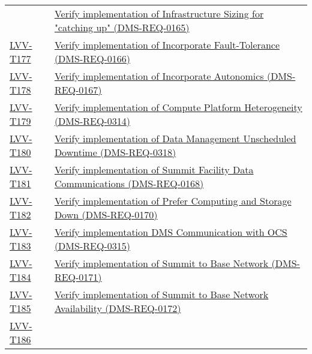 \begin{longtable}[]{@{}ll@{}}
&
\href{https://jira.lsstcorp.org/secure/Tests.jspa\#/testCase/LVV-T176}{Verify
implementation of Infrastructure Sizing for "catching up"
(DMS-REQ-0165)}\tabularnewline
\protect\hyperlink{lvv-t177---verify-implementation-of-incorporate-fault-tolerance-dms-req-0166}{LVV-T177}
&
\href{https://jira.lsstcorp.org/secure/Tests.jspa\#/testCase/LVV-T177}{Verify
implementation of Incorporate Fault-Tolerance
(DMS-REQ-0166)}\tabularnewline
\protect\hyperlink{lvv-t178---verify-implementation-of-incorporate-autonomics-dms-req-0167}{LVV-T178}
&
\href{https://jira.lsstcorp.org/secure/Tests.jspa\#/testCase/LVV-T178}{Verify
implementation of Incorporate Autonomics (DMS-REQ-0167)}\tabularnewline
\protect\hyperlink{lvv-t179---verify-implementation-of-compute-platform-heterogeneity-dms-req-0314}{LVV-T179}
&
\href{https://jira.lsstcorp.org/secure/Tests.jspa\#/testCase/LVV-T179}{Verify
implementation of Compute Platform Heterogeneity
(DMS-REQ-0314)}\tabularnewline
\protect\hyperlink{lvv-t180---verify-implementation-of-data-management-unscheduled-downtime-dms-req-0318}{LVV-T180}
&
\href{https://jira.lsstcorp.org/secure/Tests.jspa\#/testCase/LVV-T180}{Verify
implementation of Data Management Unscheduled Downtime
(DMS-REQ-0318)}\tabularnewline
\protect\hyperlink{lvv-t181---verify-implementation-of-summit-facility-data-communications-dms-req-0168}{LVV-T181}
&
\href{https://jira.lsstcorp.org/secure/Tests.jspa\#/testCase/LVV-T181}{Verify
implementation of Summit Facility Data Communications
(DMS-REQ-0168)}\tabularnewline
\protect\hyperlink{lvv-t182---verify-implementation-of-prefer-computing-and-storage-down-dms-req-0170}{LVV-T182}
&
\href{https://jira.lsstcorp.org/secure/Tests.jspa\#/testCase/LVV-T182}{Verify
implementation of Prefer Computing and Storage Down
(DMS-REQ-0170)}\tabularnewline
\protect\hyperlink{lvv-t183---verify-implementation-dms-communication-with-ocs-dms-req-0315}{LVV-T183}
&
\href{https://jira.lsstcorp.org/secure/Tests.jspa\#/testCase/LVV-T183}{Verify
implementation DMS Communication with OCS (DMS-REQ-0315)}\tabularnewline
\protect\hyperlink{lvv-t184---verify-implementation-of-summit-to-base-network-dms-req-0171}{LVV-T184}
&
\href{https://jira.lsstcorp.org/secure/Tests.jspa\#/testCase/LVV-T184}{Verify
implementation of Summit to Base Network (DMS-REQ-0171)}\tabularnewline
\protect\hyperlink{lvv-t185---verify-implementation-of-summit-to-base-network-availability-dms-req-0172}{LVV-T185}
&
\href{https://jira.lsstcorp.org/secure/Tests.jspa\#/testCase/LVV-T185}{Verify
implementation of Summit to Base Network Availability
(DMS-REQ-0172)}\tabularnewline
\protect\hyperlink{lvv-t186---verify-implementation-of-summit-to-base-network-reliability-dms-req-0173}{LVV-T186}

\end{longtable}
